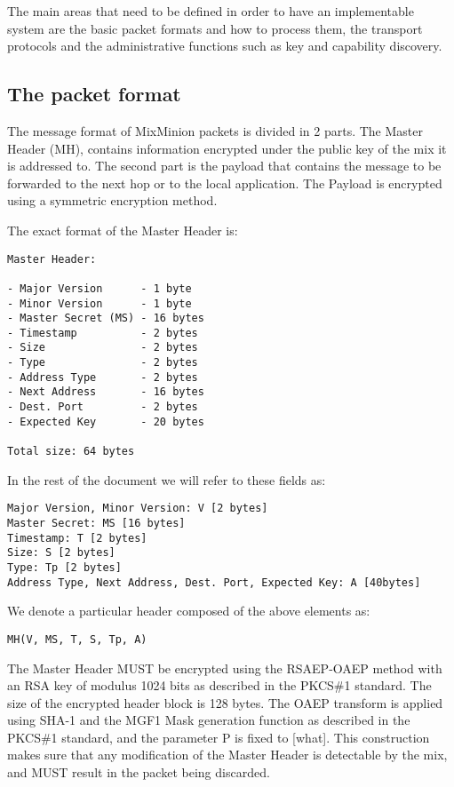 \documentclass{article}
\begin{document}
The main areas that need to be defined in order to have an
implementable system are the basic packet formats and how to process
them, the transport protocols and the administrative functions such as
key and capability discovery. 

\subsection{The packet format}

The message format of MixMinion packets is divided in
2 parts. The Master Header (MH), contains information encrypted under 
the public key of the mix it is addressed to. The second part is the 
payload that contains the message to be forwarded to the next hop or 
to the local application. The Payload is encrypted using a symmetric 
encryption method.

The exact format of the Master Header is:

\begin{verbatim}
Master Header:

- Major Version      - 1 byte
- Minor Version      - 1 byte
- Master Secret (MS) - 16 bytes
- Timestamp          - 2 bytes
- Size               - 2 bytes
- Type               - 2 bytes
- Address Type       - 2 bytes
- Next Address       - 16 bytes
- Dest. Port         - 2 bytes
- Expected Key       - 20 bytes

Total size: 64 bytes
\end{verbatim}

In the rest of the document we will refer to these fields as:

\begin{verbatim}
Major Version, Minor Version: V [2 bytes]
Master Secret: MS [16 bytes]
Timestamp: T [2 bytes]
Size: S [2 bytes]
Type: Tp [2 bytes]
Address Type, Next Address, Dest. Port, Expected Key: A [40bytes]
\end{verbatim}

We denote a particular header composed of the above elements as:

\begin{verbatim}MH(V, MS, T, S, Tp, A)\end{verbatim}

The Master Header MUST be encrypted using the RSAEP-OAEP method with
an RSA key of modulus 1024 bits as described in the PKCS\#1
standard. The size of the encrypted header block is 128 bytes. The
OAEP transform is applied using SHA-1 and the MGF1 Mask 
generation function as described in the PKCS\#1 standard, and the 
parameter P is fixed to [what]. This construction 
makes sure that any modification of the Master Header is detectable by 
the mix, and MUST result in the packet being discarded.
\end{document}
